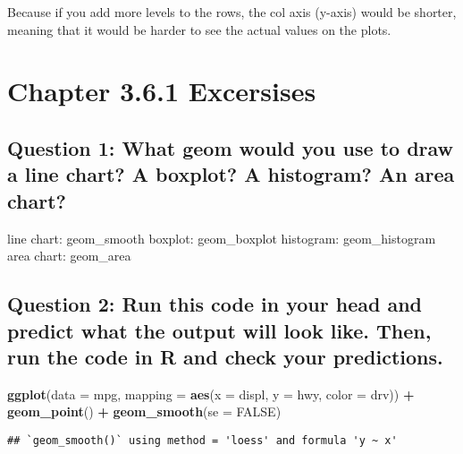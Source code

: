 \documentclass[
]{book}
\newenvironment{Shaded}{\begin{snugshade}}{\end{snugshade}}
\newcommand{\DataTypeTok}[1]{\textcolor[rgb]{0.13,0.29,0.53}{#1}}
\newcommand{\KeywordTok}[1]{\textcolor[rgb]{0.13,0.29,0.53}{\textbf{#1}}}
\newcommand{\NormalTok}[1]{#1}
\newcommand{\OperatorTok}[1]{\textcolor[rgb]{0.81,0.36,0.00}{\textbf{#1}}}
\newcommand{\OtherTok}[1]{\textcolor[rgb]{0.56,0.35,0.01}{#1}}
\newcommand{\StringTok}[1]{\textcolor[rgb]{0.31,0.60,0.02}{#1}}
\begin{document}
Because if you add more levels to the rows, the col axis (y-axis) would be shorter, meaning that it would be harder to see the actual values on the plots.

\hypertarget{chapter-3.6.1-excersises}{%
\section{Chapter 3.6.1 Excersises}\label{chapter-3.6.1-excersises}}

\hypertarget{question-1-what-geom-would-you-use-to-draw-a-line-chart-a-boxplot-a-histogram-an-area-chart}{%
\subsection{Question 1: What geom would you use to draw a line chart? A boxplot? A histogram? An area chart?}\label{question-1-what-geom-would-you-use-to-draw-a-line-chart-a-boxplot-a-histogram-an-area-chart}}

line chart: geom\_smooth
boxplot: geom\_boxplot
histogram: geom\_histogram
area chart: geom\_area

\hypertarget{question-2-run-this-code-in-your-head-and-predict-what-the-output-will-look-like.-then-run-the-code-in-r-and-check-your-predictions.}{%
\subsection{Question 2: Run this code in your head and predict what the output will look like. Then, run the code in R and check your predictions.}\label{question-2-run-this-code-in-your-head-and-predict-what-the-output-will-look-like.-then-run-the-code-in-r-and-check-your-predictions.}}

\begin{Shaded}
\begin{Highlighting}[]
\KeywordTok{ggplot}\NormalTok{(}\DataTypeTok{data =}\NormalTok{ mpg, }\DataTypeTok{mapping =} \KeywordTok{aes}\NormalTok{(}\DataTypeTok{x =}\NormalTok{ displ, }\DataTypeTok{y =}\NormalTok{ hwy, }\DataTypeTok{color =}\NormalTok{ drv)) }\OperatorTok{+}\StringTok{ }
\StringTok{  }\KeywordTok{geom_point}\NormalTok{() }\OperatorTok{+}\StringTok{ }
\StringTok{  }\KeywordTok{geom_smooth}\NormalTok{(}\DataTypeTok{se =} \OtherTok{FALSE}\NormalTok{)}
\end{Highlighting}
\end{Shaded}

\begin{verbatim}
## `geom_smooth()` using method = 'loess' and formula 'y ~ x'
\end{verbatim}
\end{document}
